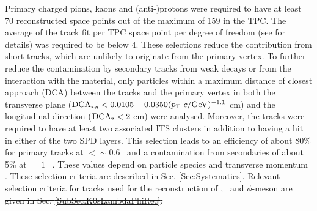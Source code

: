 \documentclass[ALICE,manyauthors]{cernphprep}
\providecommand{\DIFaddtex}[1]{{\protect\color{blue}\uwave{#1}}} %
\providecommand{\DIFdeltex}[1]{{\protect\color{red}\sout{#1}}}                      %
\providecommand{\DIFaddbegin}{} %
\providecommand{\DIFaddend}{} %
\providecommand{\DIFdelbegin}{} %
\providecommand{\DIFdelend}{} %
\providecommand{\DIFadd}[1]{\texorpdfstring{\DIFaddtex{#1}}{#1}} %
\providecommand{\DIFdel}[1]{\texorpdfstring{\DIFdeltex{#1}}{}} %
\newcommand{\DIFscaledelfig}{0.5}
\newlength{\DIFdelgraphicswidth} %
\newlength{\DIFdelgraphicsheight} %
\newcommand{\DIFaddincludegraphics}[2][]{{\color{blue}\fbox{\DIFOincludegraphics[#1]{#2}}}} %
\newcommand{\DIFdelincludegraphics}[2][]{%
\sbox{\DIFdelgraphicsbox}{\DIFOincludegraphics[#1]{#2}}%
\settoboxwidth{\DIFdelgraphicswidth}{\DIFdelgraphicsbox} %
\settoboxtotalheight{\DIFdelgraphicsheight}{\DIFdelgraphicsbox} %
\scalebox{\DIFscaledelfig}{%
\parbox[b]{\DIFdelgraphicswidth}{\usebox{\DIFdelgraphicsbox}\\[-\baselineskip] \rule{\DIFdelgraphicswidth}{0em}}\llap{\resizebox{\DIFdelgraphicswidth}{\DIFdelgraphicsheight}{%
\setlength{\unitlength}{\DIFdelgraphicswidth}%
\begin{picture}(1,1)%
\thicklines\linethickness{2pt} %
{\color[rgb]{1,0,0}\put(0,0){\framebox(1,1){}}}%
{\color[rgb]{1,0,0}\put(0,0){\line( 1,1){1}}}%
{\color[rgb]{1,0,0}\put(0,1){\line(1,-1){1}}}%
\end{picture}%
}\hspace*{3pt}}} %
} %
\DeclareRobustCommand{\DIFaddbegin}{\DIFOaddbegin \let\includegraphics\DIFaddincludegraphics} %
\DeclareRobustCommand{\DIFaddend}{\DIFOaddend \let\includegraphics\DIFOincludegraphics} %
\DeclareRobustCommand{\DIFdelbegin}{\DIFOdelbegin \let\includegraphics\DIFdelincludegraphics} %
\DeclareRobustCommand{\DIFdelend}{\DIFOaddend \let\includegraphics\DIFOincludegraphics} %
\begin{document}
Primary charged pions, kaons and (anti-)protons were required to have at least 70 reconstructed space points out of the maximum of 159 in the TPC. The average of the track fit per TPC space point per degree of freedom (see \cite{Abelev:2014ffa} for details) was required to be below 4. These selections reduce the contribution from short tracks, which are unlikely to originate from the primary vertex. To \DIFdelbegin \DIFdel{further }\DIFdelend reduce the contamination by secondary tracks from weak decays or from the interaction with the material, only particles within a maximum distance of closest approach (DCA) between the tracks and the primary vertex in both the transverse plane (${\rm{DCA}}_{xy} < 0.0105 + 0.0350(p_{\rm{T}}~c/{\rm{GeV}})^{-1.1}$ cm) and the longitudinal direction ($\rm{DCA}_{z} < 2$ cm) were analysed. Moreover, the tracks were required to have at least two associated ITS clusters in addition to having a hit in either of the two SPD layers. This selection leads to an efficiency of about 80\% for primary tracks at \pT\DIFdelbegin \DIFdel{$ < \sim 0.6$ }\DIFdelend \DIFaddbegin \DIFadd{~$\sim0.6$ }\DIFaddend \GeV~and a contamination from secondaries of about 5\% at \pT\DIFdelbegin \DIFdel{$= 1$ }\DIFdelend \DIFaddbegin \DIFadd{~$=1$ }\DIFaddend \GeV~\cite{Abelev:2013vea}. These values depend on particle species and transverse momentum \cite{Abelev:2013vea}. \DIFdelbegin \DIFdel{These selection criteria are described in Sec. \ref{Sec:Systematics}. Relevant selection criteria for tracks used for the reconstruction of }%
\DIFdel{, }%
\DIFdel{~and $\phi$-meson are given in Sec. \ref{SubSec:K0sLambdaPhiRec}.
}\DIFdelend %

\end{document}
